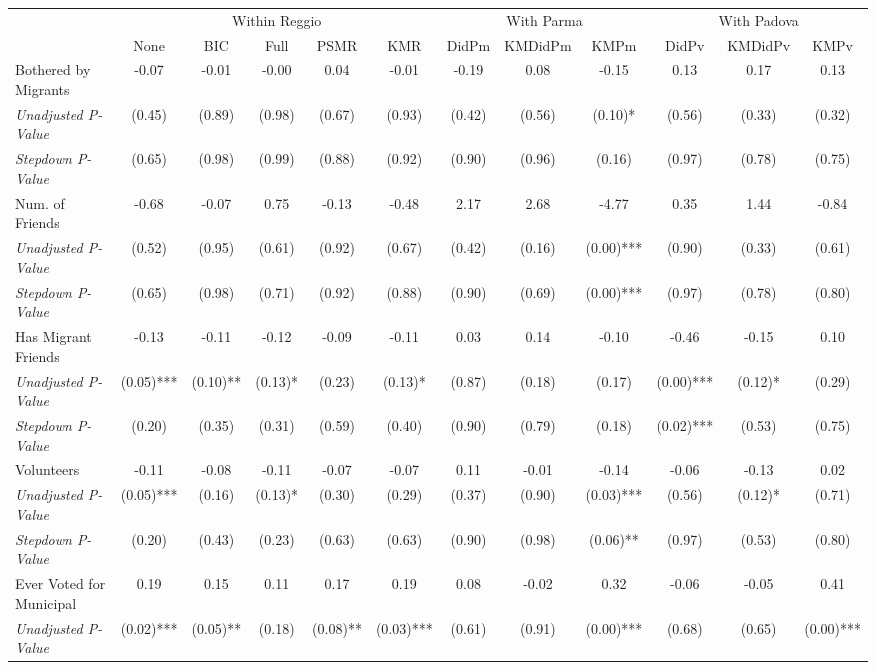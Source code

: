 \begin{tabular}{l c c c c c c c c c c c}
\toprule
& \multicolumn{5}{c}{Within Reggio} & \multicolumn{3}{c}{With Parma} & \multicolumn{3}{c}{With Padova} \\\cmidrule(lr){2-6} \cmidrule(lr){7-9} \cmidrule(lr){10-12}
 & None & BIC & Full & PSMR & KMR & DidPm & KMDidPm & KMPm & DidPv & KMDidPv & KMPv \\
\midrule
Bothered by Migrants & -0.07 & -0.01 & -0.00 & 0.04 & -0.01 & -0.19 & 0.08 & -0.15 & 0.13 & 0.17 & 0.13 \\
\quad \textit{Unadjusted P-Value} & (0.45) & (0.89) & (0.98) & (0.67) & (0.93) & (0.42) & (0.56) & (0.10)* & (0.56) & (0.33) & (0.32) \\
\quad \textit{Stepdown P-Value} & (0.65) & (0.98) & (0.99) & (0.88) & (0.92) & (0.90) & (0.96) & (0.16) & (0.97) & (0.78) & (0.75) \\
Num. of Friends & -0.68 & -0.07 & 0.75 & -0.13 & -0.48 & 2.17 & 2.68 & -4.77 & 0.35 & 1.44 & -0.84 \\
\quad \textit{Unadjusted P-Value} & (0.52) & (0.95) & (0.61) & (0.92) & (0.67) & (0.42) & (0.16) & (0.00)*** & (0.90) & (0.33) & (0.61) \\
\quad \textit{Stepdown P-Value} & (0.65) & (0.98) & (0.71) & (0.92) & (0.88) & (0.90) & (0.69) & (0.00)*** & (0.97) & (0.78) & (0.80) \\
Has Migrant Friends & -0.13 & -0.11 & -0.12 & -0.09 & -0.11 & 0.03 & 0.14 & -0.10 & -0.46 & -0.15 & 0.10 \\
\quad \textit{Unadjusted P-Value} & (0.05)*** & (0.10)** & (0.13)* & (0.23) & (0.13)* & (0.87) & (0.18) & (0.17) & (0.00)*** & (0.12)* & (0.29) \\
\quad \textit{Stepdown P-Value} & (0.20) & (0.35) & (0.31) & (0.59) & (0.40) & (0.90) & (0.79) & (0.18) & (0.02)*** & (0.53) & (0.75) \\
Volunteers & -0.11 & -0.08 & -0.11 & -0.07 & -0.07 & 0.11 & -0.01 & -0.14 & -0.06 & -0.13 & 0.02 \\
\quad \textit{Unadjusted P-Value} & (0.05)*** & (0.16) & (0.13)* & (0.30) & (0.29) & (0.37) & (0.90) & (0.03)*** & (0.56) & (0.12)* & (0.71) \\
\quad \textit{Stepdown P-Value} & (0.20) & (0.43) & (0.23) & (0.63) & (0.63) & (0.90) & (0.98) & (0.06)** & (0.97) & (0.53) & (0.80) \\
Ever Voted for Municipal & 0.19 & 0.15 & 0.11 & 0.17 & 0.19 & 0.08 & -0.02 & 0.32 & -0.06 & -0.05 & 0.41 \\
\quad \textit{Unadjusted P-Value} & (0.02)*** & (0.05)** & (0.18) & (0.08)** & (0.03)*** & (0.61) & (0.91) & (0.00)*** & (0.68) & (0.65) & (0.00)*** \\

\end{tabular}
